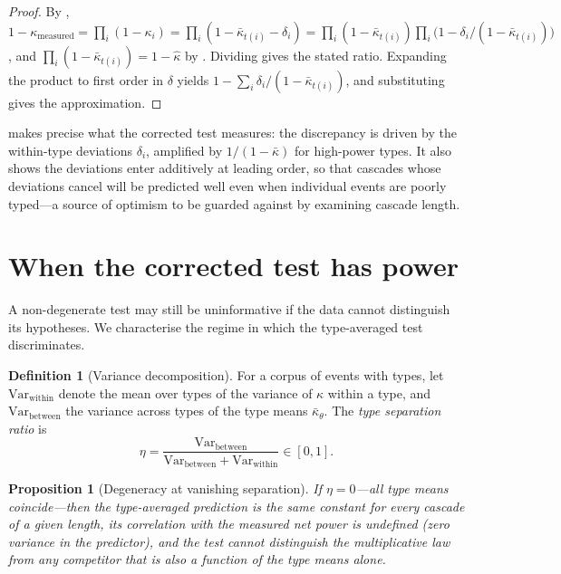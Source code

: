\documentclass[11pt,a4paper]{article}
\theoremstyle{thmstyle}
\newtheorem{proposition}[theorem]{Proposition}
\theoremstyle{definition}
\newtheorem{definition}[theorem]{Definition}
\theoremstyle{remark}
\newcommand{\kap}{\kappa}
\begin{document}
\begin{proof}
By ,
$1-\kap_{\mathrm{measured}}=\prod_i(1-\kap_i)
=\prod_i(1-\bar\kap_{t(i)}-\delta_i)
=\prod_i(1-\bar\kap_{t(i)})\prod_i\bigl(1-\delta_i/(1-\bar\kap_{t(i)})\bigr)$,
and $\prod_i(1-\bar\kap_{t(i)})=1-\hat\kap$ by . Dividing
gives the stated ratio. Expanding the product to first order in $\delta$
yields $1-\sum_i\delta_i/(1-\bar\kap_{t(i)})$, and substituting gives the
approximation.
\end{proof}

 makes precise what the corrected test measures: the
discrepancy is driven by the within-type deviations $\delta_i$, amplified by
$1/(1-\bar\kap)$ for high-power types. It also shows the deviations enter
additively at leading order, so that cascades whose deviations cancel will
be predicted well even when individual events are poorly typed---a source of
optimism to be guarded against by examining cascade length.

\section{When the corrected test has power}
\label{sec:power-analysis}

A non-degenerate test may still be uninformative if the data cannot
distinguish its hypotheses. We characterise the regime in which the
type-averaged test discriminates.

\begin{definition}[Variance decomposition]
\label{def:variance}
For a corpus of events with types, let $\mathrm{Var}_{\mathrm{within}}$
denote the mean over types of the variance of $\kap$ within a type, and
$\mathrm{Var}_{\mathrm{between}}$ the variance across types of the type
means $\bar\kap_\theta$. The \emph{type separation ratio} is
\[
\eta=\frac{\mathrm{Var}_{\mathrm{between}}}
{\mathrm{Var}_{\mathrm{between}}+\mathrm{Var}_{\mathrm{within}}}\in[0,1].
\]
\end{definition}

\begin{proposition}[Degeneracy at vanishing separation]
\label{prop:degeneracy}
If $\eta=0$---all type means coincide---then the type-averaged prediction is
the same constant for every cascade of a given length, its correlation with
the measured net power is undefined \textup{(}zero variance in the
predictor\textup{)}, and the test cannot distinguish the multiplicative law
from any competitor that is also a function of the type means alone.
\end{proposition}
\end{document}
